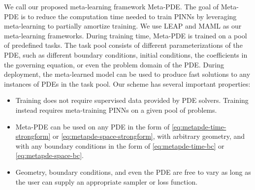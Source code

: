 We call our proposed meta-learning framework Meta-PDE. The goal of Meta-PDE is to reduce the computation time needed to train PINNs by leveraging meta-learning to partially amortize training.
We use LEAP and MAML as our meta-learning frameworks.
During training time, Meta-PDE is trained on a pool of predefined tasks.
The task pool consists of different parameterizations of the PDE, such as different boundary conditions, initial conditions, the coefficients in the governing equation, or even the problem domain of the PDE.
During deployment, the meta-learned model can be used to produce fast solutions to any instances of PDEs in the task pool.
Our scheme has several important properties:
\begin{itemize}
    \item Training does not require supervised data provided by PDE solvers. Training instead requires meta-training PINNs on a given pool of problems.
    \item Meta-PDE can be used on any PDE in the form of \cref{eq:metapde-time-strongform} or \cref{eq:metapde-space-strongform}, with arbitrary geometry, and with any boundary conditions in the form of \cref{eq:metapde-time-bc} or \cref{eq:metapde-space-bc}.
    \item Geometry, boundary conditions, and even the PDE are free to vary as long as the user can supply an appropriate sampler or loss function.
\end{itemize}





